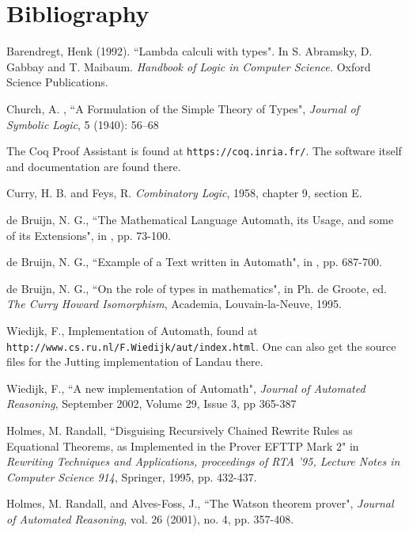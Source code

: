 \documentclass[12pt]{article}
\begin{document}
\newpage







\section{Bibliography}

\begin{thebibliography}{99}

 Barendregt, Henk (1992). ``Lambda calculi with types". In S. Abramsky, D. Gabbay and T. Maibaum. {\em Handbook of Logic in Computer Science.\/}  Oxford Science Publications.

  Church, A. , ``A Formulation of the Simple Theory of Types", {\em Journal of Symbolic Logic\/}, 5 (1940): 56–68

  The Coq Proof Assistant is found at {\tt https://coq.inria.fr/}.  The software itself and documentation are found there.

 Curry, H. B. and Feys, R. {\em Combinatory Logic}, 1958, chapter 9, section E.

 de Bruijn, N. G., ``The Mathematical Language Automath, its Usage, and some of its Extensions", in \cite{automathbook}, pp. 73-100.

 de Bruijn, N. G., ``Example of a Text written in Automath", in \cite{automathbook}, pp. 687-700.

 de Bruijn, N. G., ``On the role of types in mathematics", in Ph. de Groote, ed.  {\em The Curry Howard Isomorphism}, Academia, Louvain-la-Neuve, 1995.

  Wiedijk, F., Implementation of Automath, found at {\tt http://www.cs.ru.nl/F.Wiedijk/aut/index.html}.  One can also get the source files for the Jutting implementation of Landau there.

 Wiedijk, F.,  ``A new implementation of Automath", {\em Journal of Automated Reasoning\/}, September 2002, Volume 29, Issue 3, pp 365-387

  Holmes, M. Randall, ``Disguising Recursively Chained Rewrite Rules as Equational Theorems, as Implemented in the Prover EFTTP Mark 2" in {\em Rewriting Techniques and Applications, proceedings of RTA '95, Lecture Notes in Computer Science 914}, Springer, 1995, pp. 432-437.

  Holmes, M. Randall, and Alves-Foss, J., ``The Watson theorem prover", {\em Journal  of
Automated Reasoning\/}, vol.  26 (2001), no.  4, pp.  357-408.


\end{thebibliography}
\end{document}
